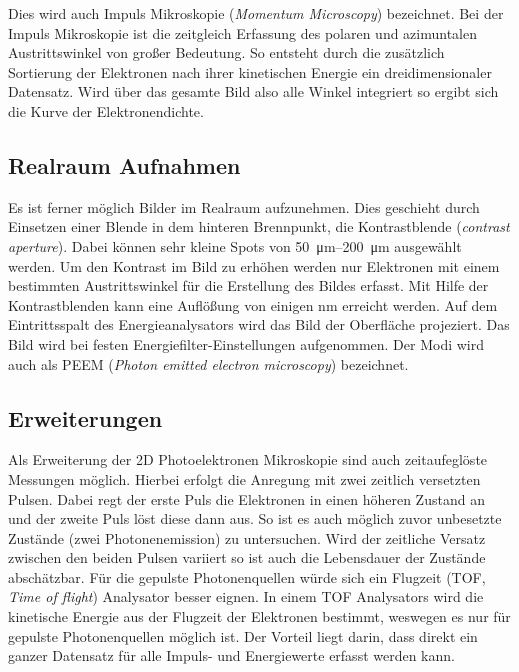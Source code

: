            Dies wird auch Impuls Mikroskopie (\textit{Momentum Microscopy}) bezeichnet.
            Bei der Impuls Mikroskopie ist die zeitgleich Erfassung des polaren und azimuntalen Austrittswinkel von großer Bedeutung. 
            So entsteht durch die zusätzlich Sortierung der Elektronen nach ihrer kinetischen Energie ein dreidimensionaler Datensatz.
            Wird über das gesamte Bild also alle Winkel integriert so ergibt sich die Kurve der Elektronendichte.

        \subsection{Realraum Aufnahmen}
            Es ist ferner möglich Bilder im Realraum aufzunehmen.
            Dies geschieht durch Einsetzen einer Blende in dem hinteren Brennpunkt, die Kontrastblende (\textit{contrast aperture}).
            Dabei können sehr kleine Spots von \SIrange{50}{200}{\micro\meter} ausgewählt werden.
            Um den Kontrast im Bild zu erhöhen werden nur Elektronen mit einem bestimmten Austrittswinkel für die Erstellung des Bildes erfasst.
            Mit Hilfe der Kontrastblenden kann eine Auflößung von einigen \si{\nano\meter} erreicht werden. 
            Auf dem Eintrittsspalt des Energieanalysators wird das Bild der Oberfläche projeziert.
            Das Bild wird bei festen Energiefilter-Einstellungen aufgenommen.
            Der Modi wird auch als PEEM (\textit{Photon emitted electron microscopy}) bezeichnet.

        \subsection{Erweiterungen}
            Als Erweiterung der 2D Photoelektronen Mikroskopie sind auch zeitaufeglöste Messungen möglich.
            Hierbei erfolgt die Anregung mit zwei zeitlich versetzten Pulsen. 
            Dabei regt der erste Puls die Elektronen in einen höheren Zustand an und der zweite Puls löst diese dann aus.
            So ist es auch möglich zuvor unbesetzte Zustände (zwei Photonenemission) zu untersuchen.
            Wird der zeitliche Versatz zwischen den beiden Pulsen variiert so ist auch die Lebensdauer der Zustände abschätzbar.
            Für die gepulste Photonenquellen würde sich ein Flugzeit (TOF, \textit{Time of flight}) Analysator besser eignen.
            In einem TOF Analysators wird die kinetische Energie aus der Flugzeit der Elektronen bestimmt, weswegen es nur für gepulste Photonenquellen möglich ist.
            Der Vorteil liegt darin, dass direkt ein ganzer Datensatz für alle Impuls- und Energiewerte erfasst werden kann.


